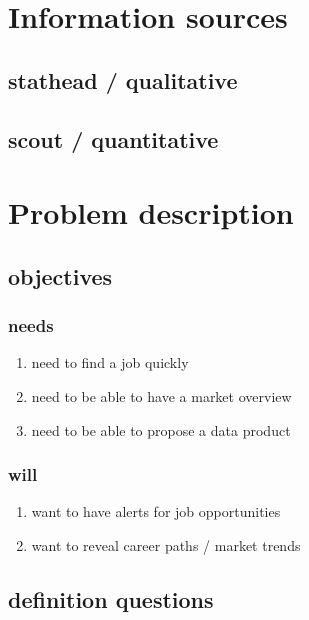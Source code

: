 \documentclass[11pt]{article}
\author{teddd}
\date{\today}
\title{}
\begin{document}
\tableofcontents

\section{Information sources}
\label{sec:org31ca89d}
\subsection{stathead / qualitative}
\label{sec:orgd0a01d1}
\subsection{scout / quantitative}
\label{sec:org6916bdb}
\section{Problem description}
\label{sec:orgd6c3399}
\subsection{objectives}
\label{sec:org68371c9}
\subsubsection{needs}
\label{sec:org8bea184}
\begin{enumerate}
\item need to find a job quickly
\label{sec:orgecdb760}
\item need to be able to have a market overview
\label{sec:org0329cef}
\item need to be able to propose a data product
\label{sec:orgcbcbbe5}
\end{enumerate}
\subsubsection{will}
\label{sec:org7283bdf}
\begin{enumerate}
\item want to have alerts for job opportunities
\label{sec:orgba3fbc0}
\item want to reveal career paths / market trends
\label{sec:org0e7b82f}
\end{enumerate}
\subsection{definition questions}
\label{sec:org4b09c1d}
\end{document}
